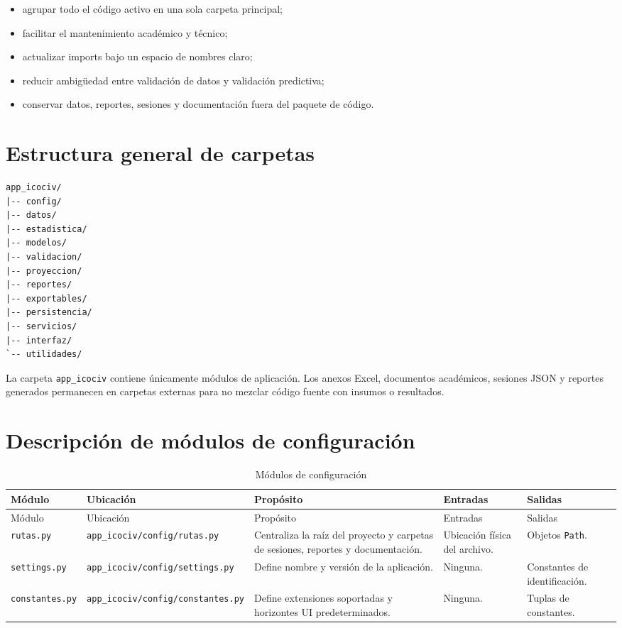 \documentclass[12pt,letterpaper]{article}
\begin{document}
\begin{itemize}[leftmargin=*]
    \item agrupar todo el código activo en una sola carpeta principal;
    \item facilitar el mantenimiento académico y técnico;
    \item actualizar imports bajo un espacio de nombres claro;
    \item reducir ambigüedad entre validación de datos y validación predictiva;
    \item conservar datos, reportes, sesiones y documentación fuera del paquete de código.
\end{itemize}

\section{Estructura general de carpetas}

\begin{lstlisting}[style=pythonicociv]
app_icociv/
|-- config/
|-- datos/
|-- estadistica/
|-- modelos/
|-- validacion/
|-- proyeccion/
|-- reportes/
|-- exportables/
|-- persistencia/
|-- servicios/
|-- interfaz/
`-- utilidades/
\end{lstlisting}

La carpeta \texttt{app\_icociv} contiene únicamente módulos de aplicación. Los anexos Excel, documentos académicos, sesiones JSON y reportes generados permanecen en carpetas externas para no mezclar código fuente con insumos o resultados.

\section{Descripción de módulos de configuración}

\begin{longtable}{p{}p{}p{}p{}p{}}
\caption{Módulos de configuración}
\label{tab:modulos_configuracion}\\
\toprule
Módulo & Ubicación & Propósito & Entradas & Salidas \\
\midrule
\endfirsthead
\toprule
Módulo & Ubicación & Propósito & Entradas & Salidas \\
\midrule
\endhead
\texttt{rutas.py} & \texttt{app\_icociv/config/rutas.py} & Centraliza la raíz del proyecto y carpetas de sesiones, reportes y documentación. & Ubicación física del archivo. & Objetos \texttt{Path}. \\
\texttt{settings.py} & \texttt{app\_icociv/config/settings.py} & Define nombre y versión de la aplicación. & Ninguna. & Constantes de identificación. \\
\texttt{constantes.py} & \texttt{app\_icociv/config/constantes.py} & Define extensiones soportadas y horizontes UI predeterminados. & Ninguna. & Tuplas de constantes. \\
\bottomrule
\end{longtable}
\end{document}
